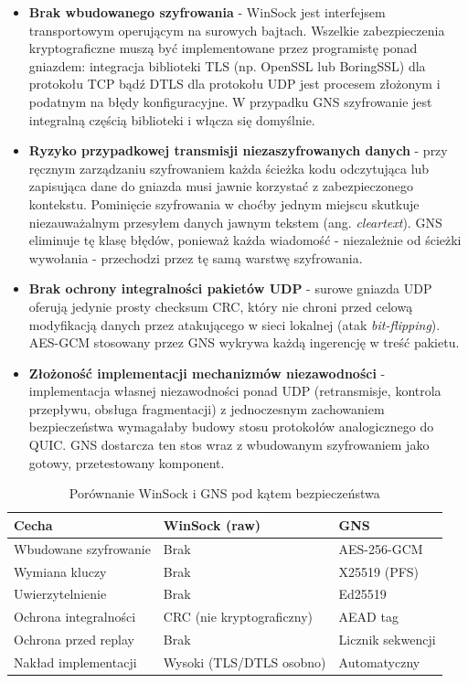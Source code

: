 \begin{itemize}
    \item \textbf{Brak wbudowanego szyfrowania} - WinSock jest interfejsem
    transportowym operującym na surowych bajtach. Wszelkie zabezpieczenia
    kryptograficzne muszą być implementowane przez programistę ponad
    gniazdem: integracja biblioteki TLS (np. OpenSSL \cite{OpenSSL}
    lub BoringSSL) dla protokołu TCP bądź DTLS dla protokołu UDP
    jest procesem złożonym i podatnym na błędy konfiguracyjne.
    W przypadku GNS szyfrowanie jest integralną częścią biblioteki
    i włącza się domyślnie.

    \item \textbf{Ryzyko przypadkowej transmisji niezaszyfrowanych danych}
    - przy ręcznym zarządzaniu szyfrowaniem każda ścieżka kodu
    odczytująca lub zapisująca dane do gniazda musi jawnie korzystać
    z zabezpieczonego kontekstu. Pominięcie szyfrowania w choćby jednym
    miejscu skutkuje niezauważalnym przesyłem danych jawnym tekstem
    (ang. \textit{cleartext}). GNS eliminuje tę klasę błędów, ponieważ
    każda wiadomość - niezależnie od ścieżki wywołania - przechodzi
    przez tę samą warstwę szyfrowania.

    \item \textbf{Brak ochrony integralności pakietów UDP} - surowe gniazda
    UDP oferują jedynie prosty checksum CRC, który nie chroni przed
    celową modyfikacją danych przez atakującego w sieci lokalnej (atak
    \textit{bit-flipping}). AES-GCM stosowany przez GNS wykrywa każdą
    ingerencję w treść pakietu.

    \item \textbf{Złożoność implementacji mechanizmów niezawodności}
    - implementacja własnej niezawodności ponad UDP (retransmisje,
    kontrola przepływu, obsługa fragmentacji) z jednoczesnym zachowaniem
    bezpieczeństwa wymagałaby budowy stosu protokołów analogicznego do QUIC.
    GNS dostarcza ten stos wraz z wbudowanym szyfrowaniem jako gotowy,
    przetestowany komponent.
\end{itemize}

\begin{table}[H]
    \centering
    \caption{Porównanie WinSock i GNS pod kątem bezpieczeństwa}
    \begin{tabularx}{\textwidth}{|l|X|X|}
        \hline
        \textbf{Cecha} & \textbf{WinSock (raw)} & \textbf{GNS} \\
        \hline
        Wbudowane szyfrowanie & Brak & AES-256-GCM \\
        \hline
        Wymiana kluczy & Brak & X25519 (PFS) \\
        \hline
        Uwierzytelnienie & Brak & Ed25519 \\
        \hline
        Ochrona integralności & CRC (nie kryptograficzny) & AEAD tag \\
        \hline
        Ochrona przed replay & Brak & Licznik sekwencji \\
        \hline
        Nakład implementacji & Wysoki (TLS/DTLS osobno) & Automatyczny \\
        \hline
    \end{tabularx}
    \label{tab:winsock_vs_gns}
\end{table}

